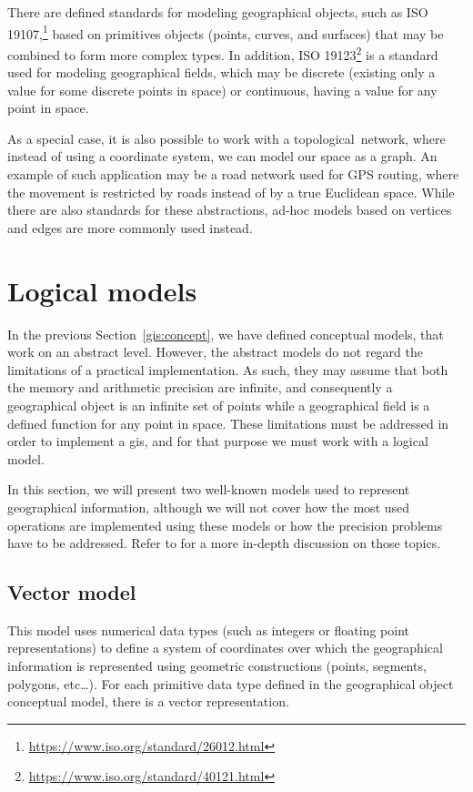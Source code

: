     There are defined standards for modeling geographical objects, such as ISO 19107,\footnote{\url{https://www.iso.org/standard/26012.html}} based on primitives objects (points, curves, and surfaces) that may be combined to form more complex types. In addition, ISO 19123\footnote{\url{https://www.iso.org/standard/40121.html}} is a standard used for modeling geographical fields, which may be discrete (existing only a value for some discrete points in space) or continuous, having a value for any point in space.
    
    As a special case, it is also possible to work with a \mbox{topological network}, where instead of using a coordinate system, we can model our space as a graph. An example of such application may be a road network used for GPS routing, where the movement is restricted by roads instead of by a true Euclidean space. While there are also standards for these abstractions, ad-hoc models based on vertices and edges are more commonly used instead.
    
    \section{Logical models}
    \label{sec:gis:logical}
    In the previous Section~\ref{gis:concept}, we have defined conceptual models, that work on an abstract level. However, the abstract models do not regard the limitations of a practical implementation. As such, they may assume that both the memory and arithmetic precision are infinite, and consequently a geographical object is an infinite set of points while a geographical field is a defined function for any point in space. These limitations must be addressed in order to implement a \gls{gis}, and for that purpose we must work with a logical model.
    
    In this section, we will present two \mbox{well-known} models used to represent geographical information, although we will not cover how the most used operations are implemented using these models or how the precision problems have to be addressed. Refer to \cite{xiao2015gis} for a more in-depth discussion on those topics.
    
    \subsection{Vector model}
    This model uses numerical data types (such as integers or floating point representations) to define a system of coordinates over which the geographical information is represented using geometric constructions (points, segments, polygons, etc\dots). For each primitive data type defined in the geographical object conceptual model, there is a vector representation.
    
